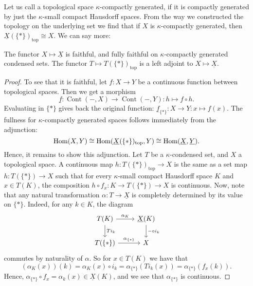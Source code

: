 \documentclass{article}
\DeclareMathOperator{\Cont}{Cont}
\renewcommand{\top}{\textrm{top}}
\begin{document}
Let us call a topological space $\kappa$-compactly generated, if
it is compactly generated by just the $\kappa$-small compact Hausdorff spaces.
From the way we constructed the topology on the underlying set
we find that if $X$ is $\kappa$-compactly generated,
then $\underline{X}(\{*\})_\top \cong X$. We can say more:
\begin{prop}
    \label{prop:compactly_generated_adjunction}
    The functor $X \mapsto \underline{X}$ is faithful, and fully
    faithful on $\kappa$-compactly generated condensed sets.
    The functor $T \mapsto T(\{*\})_\top$ is a left adjoint
    to $X \mapsto \underline{X}$.
\end{prop}
\begin{proof}
    To see that it is faithful, let $f\colon X \to Y$
    be a continuous function between topological spaces.
    Then we get a morphism
    \begin{equation*}
        \underline{f} \colon \Cont(-,X) \to \Cont(-, Y)\colon h \mapsto f\circ h.
    \end{equation*}
    Evaluating in $\{*\}$ gives back the original function:
    $\underline{f}_{\{*\}} \colon X \to Y\colon x \mapsto f(x)$.
    The fullness for $\kappa$-compactly generated spaces
    follows immediately from the adjunction:
    \begin{equation*}
        \Hom(X, Y)\cong
        \Hom(\underline{X}(\{*\})_{\top}, Y) \cong
        \Hom(\underline{X}, \underline{Y}).
    \end{equation*}
    Hence, it remains to show this adjunction.
    Let $T$ be a $\kappa$-condensed set, and $X$ a topological space.
    A continuous map $h \colon T(\{*\})_\top \to X$ is the same as
    a set map $h \colon T(\{*\}) \to X$ such that for every $\kappa$-small
    compact Hausdorff space $K$ and $x\in T(K)$, the composition
    $h \circ f_x \colon K \to T(\{*\}) \to X$ is continuous. Now, note
    that any natural transformation $\alpha \colon T \to \underline{X}$
    is completely determined by its value on $\{*\}$. Indeed, for any
    $k\in K$, the diagram
    \begin{equation*}
        \begin{tikzcd}
            T(K) \dar["T{i_k}"] \rar["\alpha_K"] & \underline{X}(K) \dar["-\circ i_k"]\\
            T(\{*\}) \rar["\alpha_{\{*\}}"] & X
        \end{tikzcd}
    \end{equation*}
    commutes by naturality of $\alpha$. So for $x \in T(K)$ we have that
    \begin{equation*}
        (\alpha_K(x))(k) = \alpha_K(x)\circ i_k =
        \alpha_{\{*\}}(T{i_k}(x)) = \alpha_{\{*\}}(f_x(k)).
    \end{equation*}
    Hence, $\alpha_{\{*\}}\circ f_x = \alpha_k(x) \in \underline{X}(K)$,
    and we see that $\alpha_{\{*\}}$ is continuous.


\end{proof}
\end{document}
